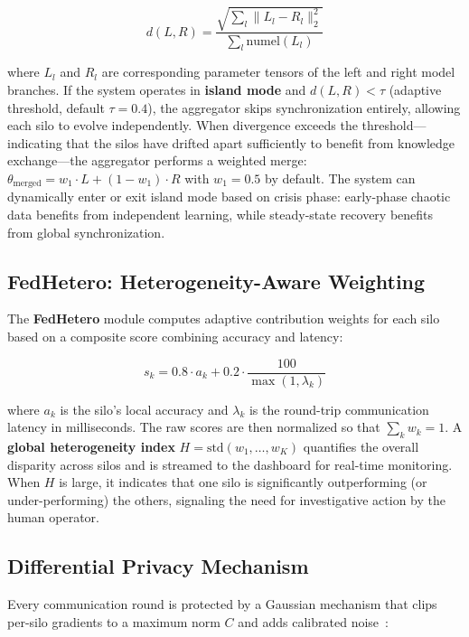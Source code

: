 \documentclass[conference]{IEEEtran}
\begin{document}
\begin{equation}
d(L, R) = \frac{\sqrt{\sum_{l}\|L_l - R_l\|_2^2}}{\sum_{l} \text{numel}(L_l)}
\label{eq:div}
\end{equation}

\noindent where $L_l$ and $R_l$ are corresponding parameter tensors of the left and right model branches. If the system operates in \textbf{island mode} and $d(L, R) < \tau$ (adaptive threshold, default $\tau = 0.4$), the aggregator skips synchronization entirely, allowing each silo to evolve independently. When divergence exceeds the threshold---indicating that the silos have drifted apart sufficiently to benefit from knowledge exchange---the aggregator performs a weighted merge: $\theta_{\text{merged}} = w_1 \cdot L + (1 - w_1) \cdot R$ with $w_1 = 0.5$ by default. The system can dynamically enter or exit island mode based on crisis phase: early-phase chaotic data benefits from independent learning, while steady-state recovery benefits from global synchronization.

\subsection{FedHetero: Heterogeneity-Aware Weighting}

The \textbf{FedHetero} module computes adaptive contribution weights for each silo based on a composite score combining accuracy and latency:

\begin{equation}
s_k = 0.8 \cdot a_k + 0.2 \cdot \frac{100}{\max(1, \lambda_k)}
\label{eq:hetero}
\end{equation}

\noindent where $a_k$ is the silo's local accuracy and $\lambda_k$ is the round-trip communication latency in milliseconds. The raw scores are then normalized so that $\sum_k w_k = 1$. A \textbf{global heterogeneity index} $H = \text{std}(w_1, \ldots, w_K)$ quantifies the overall disparity across silos and is streamed to the dashboard for real-time monitoring. When $H$ is large, it indicates that one silo is significantly outperforming (or under-performing) the others, signaling the need for investigative action by the human operator.

\subsection{Differential Privacy Mechanism}

Every communication round is protected by a Gaussian mechanism that clips per-silo gradients to a maximum norm $C$ and adds calibrated noise~\cite{b2}:
\end{document}

